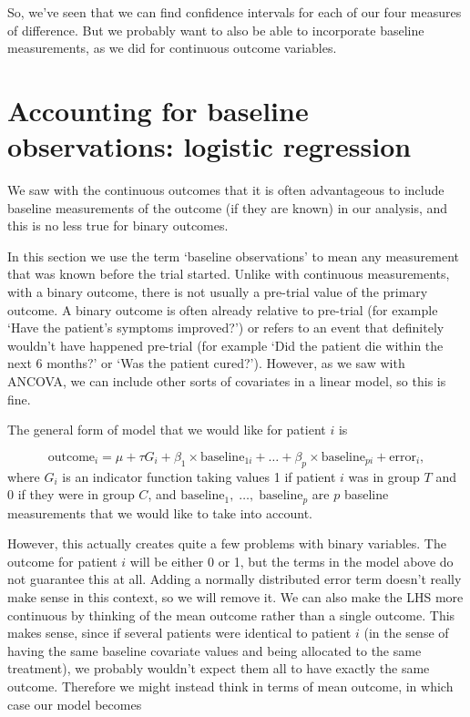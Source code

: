 \documentclass[
  openany]{book}
\theoremstyle{definition}
\theoremstyle{definition}
\theoremstyle{definition}
\theoremstyle{definition}
\theoremstyle{remark}
\begin{document}
So, we've seen that we can find confidence intervals for each of our four measures of difference. But we probably want to also be able to incorporate baseline measurements, as we
did for continuous outcome variables.

\section{Accounting for baseline observations: logistic regression}\label{logreg}

We saw with the continuous outcomes that it is often advantageous to include baseline measurements of the outcome (if they are known) in our analysis, and this is no less true for binary outcomes.

In this section we use the term `baseline observations' to mean any measurement that was known before the trial started. Unlike with continuous measurements, with a binary outcome, there is not usually a pre-trial value of the primary outcome. A binary outcome is often already relative to pre-trial (for example `Have the patient's symptoms improved?') or refers to an event that definitely wouldn't have happened pre-trial (for example `Did the patient die within the next 6 months?' or `Was the patient cured?'). However, as we saw with ANCOVA, we can include other sorts of covariates in a linear model, so this is fine.

The general form of model that we would like for patient \(i\) is

\[\text{outcome}_i = \mu + \tau G_i + \beta_1\times{\text{baseline}_{1i}} + \ldots + \beta_p\times{\text{baseline}_{pi}} + \text{error}_i,\]
where \(G_i\) is an indicator function taking values 1 if patient \(i\) was in group \(T\) and 0 if they were in group \(C\), and \(\text{baseline}_1,\;\ldots,\;\text{baseline}_p\) are \(p\) baseline measurements that we would like to take into account.

However, this actually creates quite a few problems with binary variables. The outcome for patient \(i\) will be either 0 or 1, but the terms in the model above do not guarantee this at all. Adding a normally distributed error term doesn't really make sense in this context, so we will remove it. We can also make the LHS more continuous by thinking of the mean outcome rather than a single outcome. This makes sense, since if several patients were identical to patient \(i\) (in the sense of having the same baseline covariate values and being allocated to the same treatment), we probably wouldn't expect them all to have exactly the same outcome. Therefore we might instead think in terms of mean outcome, in which case our model becomes
\end{document}
